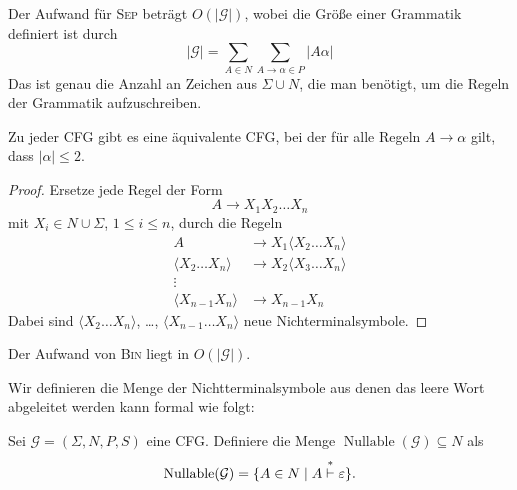 Der Aufwand für \textsc{Sep} beträgt $O(|\mathcal{G}|)$, wobei die
Größe einer Grammatik definiert ist durch
\begin{displaymath}
  |\mathcal{G}| = \sum_{A \in N}\sum_{A \to \alpha \in P} |A\alpha|
\end{displaymath}
Das ist genau die Anzahl an Zeichen aus $\Sigma\cup N$, die man benötigt, um die Regeln der Grammatik aufzuschreiben.

\begin{lemma}
  Zu jeder CFG gibt es eine äquivalente CFG, bei der für alle Regeln $A \to \alpha$ gilt, dass $|\alpha| \le 2$.
\end{lemma}
\begin{proof}
  Ersetze jede Regel der Form 
  \begin{displaymath}
    A \to X_1X_2\ldots X_n
  \end{displaymath}
  mit $X_i \in N \cup \Sigma$, $1 \le i \le n$,
  durch die Regeln 
  \begin{align*}
    A &\to X_1\langle  X_2\ldots X_n \rangle \\
    \langle  X_2\ldots X_n \rangle & \to X_2\langle  X_3\ldots X_n \rangle \\
    \vdots \\
    \langle  X_{n-1}X_n \rangle & \to X_{n-1}X_n
  \end{align*}
  Dabei sind  $\langle  X_2\ldots X_n \rangle$, \ldots, $\langle  X_{n-1}\ldots X_n \rangle$ neue Nichterminalsymbole.
\end{proof}
 Der Aufwand von \textsc{Bin} liegt in $O(|\mathcal{G}|)$.

 \bigskip


Wir definieren die Menge der Nichtterminalsymbole aus denen das leere Wort abgeleitet werden kann formal wie folgt:
\begin{Def}
  Sei $\mathcal{G} = (\Sigma, N, P, S)$ eine CFG.
  Definiere die Menge $\operatorname{Nullable}(\mathcal{G}) \subseteq N$ als
  \begin{displaymath}
    \operatorname{Nullable}(\mathcal{G}) = \{ A \in N \mid A
    \stackrel{*}{\vdash} \varepsilon \}
    \text{.} \qedhere
  \end{displaymath}
\end{Def}

